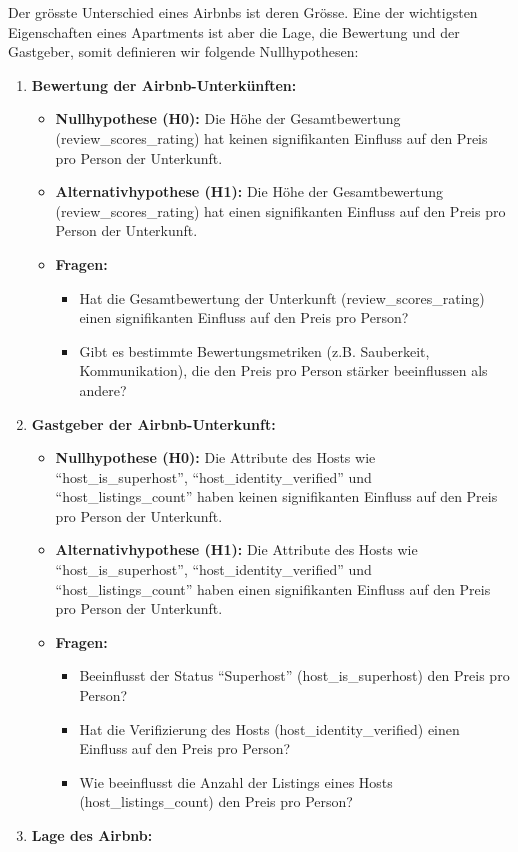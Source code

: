 \documentclass[
  journal,
]{IEEEtran}%
\providecommand{\tightlist}{%
  \setlength{\itemsep}{0pt}\setlength{\parskip}{0pt}}\usepackage{longtable,booktabs,array}
\begin{document}
Der grösste Unterschied eines Airbnbs ist deren Grösse. Eine der
wichtigsten Eigenschaften eines Apartments ist aber die Lage, die
Bewertung und der Gastgeber, somit definieren wir folgende
Nullhypothesen:

\begin{enumerate}
\def\labelenumi{\arabic{enumi}.}
\item
  \textbf{Bewertung der Airbnb-Unterkünften:}

  \begin{itemize}
  \tightlist
  \item
    \textbf{Nullhypothese (H0):} Die Höhe der Gesamtbewertung
    (review\_scores\_rating) hat keinen signifikanten Einfluss auf den
    Preis pro Person der Unterkunft.
  \item
    \textbf{Alternativhypothese (H1):} Die Höhe der Gesamtbewertung
    (review\_scores\_rating) hat einen signifikanten Einfluss auf den
    Preis pro Person der Unterkunft.
  \item
    \textbf{Fragen:}

    \begin{itemize}
    \tightlist
    \item
      Hat die Gesamtbewertung der Unterkunft (review\_scores\_rating)
      einen signifikanten Einfluss auf den Preis pro Person?
    \item
      Gibt es bestimmte Bewertungsmetriken (z.B. Sauberkeit,
      Kommunikation), die den Preis pro Person stärker beeinflussen als
      andere?
    \end{itemize}
  \end{itemize}
\item
  \textbf{Gastgeber der Airbnb-Unterkunft:}

  \begin{itemize}
  \tightlist
  \item
    \textbf{Nullhypothese (H0):} Die Attribute des Hosts wie
    ``host\_is\_superhost'', ``host\_identity\_verified'' und
    ``host\_listings\_count'' haben keinen signifikanten Einfluss auf
    den Preis pro Person der Unterkunft.
  \item
    \textbf{Alternativhypothese (H1):} Die Attribute des Hosts wie
    ``host\_is\_superhost'', ``host\_identity\_verified'' und
    ``host\_listings\_count'' haben einen signifikanten Einfluss auf den
    Preis pro Person der Unterkunft.
  \item
    \textbf{Fragen:}

    \begin{itemize}
    \item
      Beeinflusst der Status ``Superhost'' (host\_is\_superhost) den
      Preis pro Person?
    \item
      Hat die Verifizierung des Hosts (host\_identity\_verified) einen
      Einfluss auf den Preis pro Person?
    \item
      Wie beeinflusst die Anzahl der Listings eines Hosts
      (host\_listings\_count) den Preis pro Person?
    \end{itemize}
  \end{itemize}
\item
  \textbf{Lage des Airbnb:}


\end{enumerate}
\end{document}
